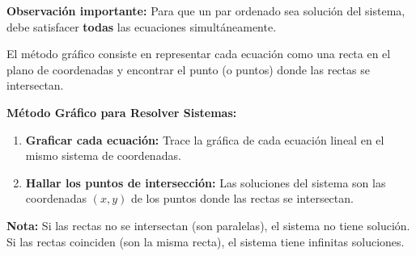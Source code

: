 \textbf{Observación importante:} Para que un par ordenado sea solución del sistema, debe satisfacer \textbf{todas} las ecuaciones simultáneamente.

\newpage

El método gráfico consiste en representar cada ecuación como una recta en el plano de coordenadas y encontrar el punto (o puntos) donde las rectas se intersectan.

\begin{theorem}
\textbf{Método Gráfico para Resolver Sistemas:}

\begin{enumerate}
    \item \textbf{Graficar cada ecuación:} Trace la gráfica de cada ecuación lineal en el mismo sistema de coordenadas.
    \item \textbf{Hallar los puntos de intersección:} Las soluciones del sistema son las coordenadas $(x, y)$ de los puntos donde las rectas se intersectan.
\end{enumerate}

\textbf{Nota:} Si las rectas no se intersectan (son paralelas), el sistema no tiene solución. Si las rectas coinciden (son la misma recta), el sistema tiene infinitas soluciones.
\end{theorem}

